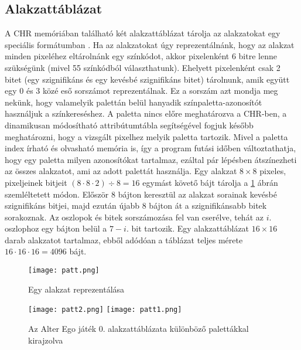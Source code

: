 \subsection{Alakzattáblázat}

A CHR memóriában található két alakzattáblázat tárolja  az alakzatokat egy speciális formátumban \cite{ppuref}. Ha az alakzatokat úgy reprezentálnánk, hogy az alakzat minden pixeléhez eltárolnánk egy színkódot, akkor pixelenként 6 bitre lenne szükségünk (mivel 55 színkódból választhatunk). Ehelyett pixelenként csak 2 bitet (egy szignifikáns és egy kevésbé szignifikáns bitet) tárolnunk, amik együtt egy 0 és 3 közé eső sorszámot reprezentálnak. Ez a sorszám azt mondja meg nekünk, hogy valamelyik palettán belül hanyadik színpaletta-azonosítót használjuk a színkereséshez. A paletta nincs előre meghatározva a CHR-ben, a dinamikusan módosítható attribútumtábla segítségével fogjuk később meghatározni, hogy a vizsgált pixelhez melyik paletta tartozik. Mivel a paletta index írható és olvasható memória is, így a program futási időben változtathatja, hogy egy paletta milyen azonosítókat tartalmaz, ezáltal pár lépésben átszínezheti az összes alakzatot, ami az adott palettát használja.
Egy alakzat $8\times 8$ pixeles, pixeljeinek bitjeit $(8\cdot8\cdot2)\div8 = 16$ egymást követő bájt tárolja a \ref{fig:patt} ábrán szemléltetett módon.
Először 8 bájton keresztül az alakzat sorainak kevésbé szignifikáns bitjei, majd ezután újabb 8 bájton át a szignifikánsabb bitek sorakoznak. Az oszlopok és bitek sorszámozása fel van cserélve, tehát az $i.$ oszlophoz egy bájton belül a $7-i.$ bit tartozik.  
Egy alakzattáblázat $16\times 16$ darab alakzatot tartalmaz, ebből adódóan a táblázat teljes mérete $16\cdot16\cdot16 = 4096$ bájt.

\begin{figure}[H]
	\centering
	\texttt{[image: patt.png]}
	\caption{Egy alakzat reprezentálása}
	\label{fig:patt}
\end{figure}


\begin{figure}[H]
	\centering
	\texttt{[image: patt2.png]}
	\hspace{5pt}
	\texttt{[image: patt1.png]}
	\caption{Az Alter Ego játék 0. alakzattáblázata különböző palettákkal kirajzolva}
\end{figure}

